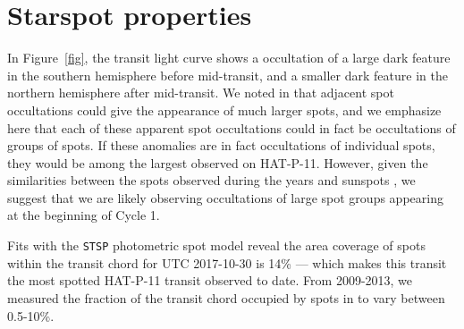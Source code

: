 \section{Starspot properties}


In Figure~\ref{fig}, the transit light curve shows a occultation of a large dark feature in the southern hemisphere before mid-transit, and a smaller dark feature in the northern hemisphere after mid-transit. We noted in \citet{Morris2017a} that adjacent spot occultations could give the appearance of much larger spots, and we emphasize here that each of these apparent spot occultations could in fact be occultations of groups of spots.  If these anomalies are in fact occultations of individual spots, they would be among the largest observed on HAT-P-11. However, given the similarities between the spots observed during the \kepler years \citep{Morris2017a} and sunspots \citep{Solanki2003}, we suggest that we are likely observing occultations of large spot groups appearing at the beginning of Cycle 1. 

Fits with the \texttt{STSP} photometric spot model \citep{Morris2017a, Hebb2018} reveal the area coverage of spots within the transit chord for UTC 2017-10-30 is 14\% --- which makes this transit the most spotted HAT-P-11 transit observed to date. From 2009-2013, we measured the fraction of the transit chord occupied by spots in \citet{Morris2017a} to vary between 0.5-10\%. 

